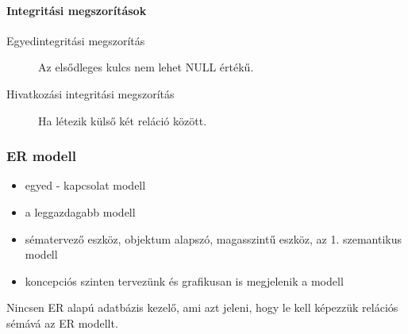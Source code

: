 \paragraph{Integritási megszorítások}
\begin{description}
	\item[Egyedintegritási megszorítás] Az elsődleges kulcs nem lehet NULL értékű.
	\item[Hivatkozási integritási megszorítás] Ha létezik külső két reláció között.
\end{description}

\subsubsection{ER modell}
\begin{itemize}[nosep]
	\item egyed - kapcsolat modell
	\item a leggazdagabb modell
	\item sématervező eszköz, objektum alapszó, magasszintű eszköz, az 1. szemantikus modell
	\item koncepciós szinten tervezünk és grafikusan is megjelenik a modell
\end{itemize}
\begin{note}
Nincsen ER alapú adatbázis kezelő, ami azt jeleni, hogy le kell képezzük relációs sémává az ER modellt.
\end{note}
